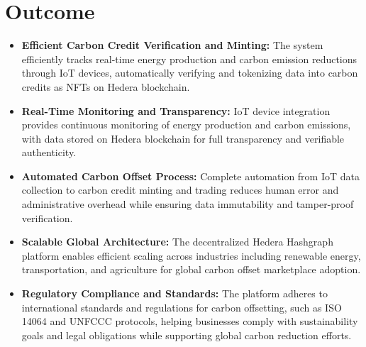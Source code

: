 \documentclass[oneside,a4paper,12pt]{book}
\begin{document}
\section{Outcome}
\begin{itemize}
    \item \textbf{Efficient Carbon Credit Verification and Minting:} The system efficiently tracks real-time energy production and carbon emission reductions through IoT devices, automatically verifying and tokenizing data into carbon credits as NFTs on Hedera blockchain.
    
    \item \textbf{Real-Time Monitoring and Transparency:} IoT device integration provides continuous monitoring of energy production and carbon emissions, with data stored on Hedera blockchain for full transparency and verifiable authenticity.
    
    \item \textbf{Automated Carbon Offset Process:} Complete automation from IoT data collection to carbon credit minting and trading reduces human error and administrative overhead while ensuring data immutability and tamper-proof verification.
    
    \item \textbf{Scalable Global Architecture:} The decentralized Hedera Hashgraph platform enables efficient scaling across industries including renewable energy, transportation, and agriculture for global carbon offset marketplace adoption.
    
    \item \textbf{Regulatory Compliance and Standards:} The platform adheres to international standards and regulations for carbon offsetting, such as ISO 14064 and UNFCCC protocols, helping businesses comply with sustainability goals and legal obligations while supporting global carbon reduction efforts.
\end{itemize}
\end{document}
